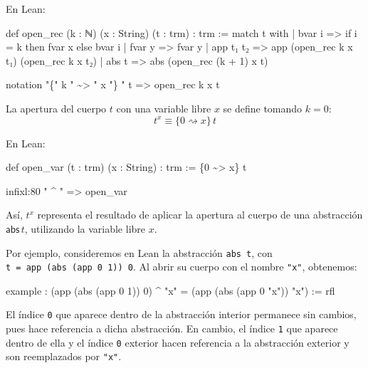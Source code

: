 \documentclass[
  spanish,
  letterpaper,
  DIV=11,
  numbers=noendperiod]{scrreprt}
\newenvironment{Shaded}{\begin{snugshade}}{\end{snugshade}}
\newcommand{\KeywordTok}[1]{\textcolor[rgb]{0.00,0.23,0.31}{\textbf{#1}}}
\newcommand{\NormalTok}[1]{\textcolor[rgb]{0.00,0.23,0.31}{#1}}
\newcommand{\StringTok}[1]{\textcolor[rgb]{0.13,0.47,0.30}{#1}}
\renewcommand{\NormalTok}[1]{\textcolor[HTML]{000000}{#1}}
\renewcommand{\KeywordTok}[1]{\textcolor[HTML]{0000FF}{#1}}
\renewcommand{\StringTok}[1]{\textcolor[HTML]{A52A2A}{#1}}
\let\oldgreater\textgreater
\renewcommand{\textgreater}{\null\oldgreater}%
\theoremstyle{remark}
\begin{document}
En Lean:

\begin{Shaded}
\begin{Highlighting}[]
\KeywordTok{def}\NormalTok{ open\_rec (k : ℕ) (x : String) (t : trm) : trm :=}
  \KeywordTok{match}\NormalTok{ t }\KeywordTok{with}
\NormalTok{  | bvar i    =\textgreater{} if i = k then fvar x else bvar i}
\NormalTok{  | fvar y    =\textgreater{} fvar y}
\NormalTok{  | app t₁ t₂ =\textgreater{} app (open\_rec k x t₁) (open\_rec k x t₂)}
\NormalTok{  | abs t     =\textgreater{} abs (open\_rec (k + 1) x t)}

\KeywordTok{notation} \StringTok{"\{"}\NormalTok{ k }\StringTok{" \textasciitilde{}\textgreater{} "}\NormalTok{ x }\StringTok{"\} "}\NormalTok{ t =\textgreater{} open\_rec k x t}
\end{Highlighting}
\end{Shaded}

La apertura del cuerpo \(t\) con una variable libre \(x\) se define
tomando \(k=0\): \[
t^x \equiv \{ 0 \rightsquigarrow x \} \, t
\]

En Lean:

\begin{Shaded}
\begin{Highlighting}[]
\KeywordTok{def}\NormalTok{ open\_var (t : trm) (x : String) : trm :=}
\NormalTok{  \{0 \textasciitilde{}\textgreater{} x\} t}

\NormalTok{infixl:80 }\StringTok{" \^{} "}\NormalTok{ =\textgreater{} open\_var}
\end{Highlighting}
\end{Shaded}

Así, \(t^x\) representa el resultado de aplicar la apertura al cuerpo de
una abstracción \(\mathsf{abs} \, t\), utilizando la variable libre
\(x\).

Por ejemplo, consideremos en Lean la abstracción \texttt{abs\ t}, con
\texttt{t\ =\ app\ (abs\ (app\ 0\ 1))\ 0}. Al abrir su cuerpo con el
nombre \texttt{"x"}, obtenemos:

\begin{Shaded}
\begin{Highlighting}[]
\KeywordTok{example}\NormalTok{ :}
\NormalTok{  (app (abs (app 0 1)) 0) \^{} }\StringTok{"x"}\NormalTok{ = (app (abs (app 0 }\StringTok{"x"}\NormalTok{)) }\StringTok{"x"}\NormalTok{) := }\KeywordTok{rfl}
\end{Highlighting}
\end{Shaded}

El índice \texttt{0} que aparece dentro de la abstracción interior
permanece sin cambios, pues hace referencia a dicha abstracción. En
cambio, el índice \texttt{1} que aparece dentro de ella y el índice
\texttt{0} exterior hacen referencia a la abstracción exterior y son
reemplazados por \texttt{"x"}.
\end{document}
